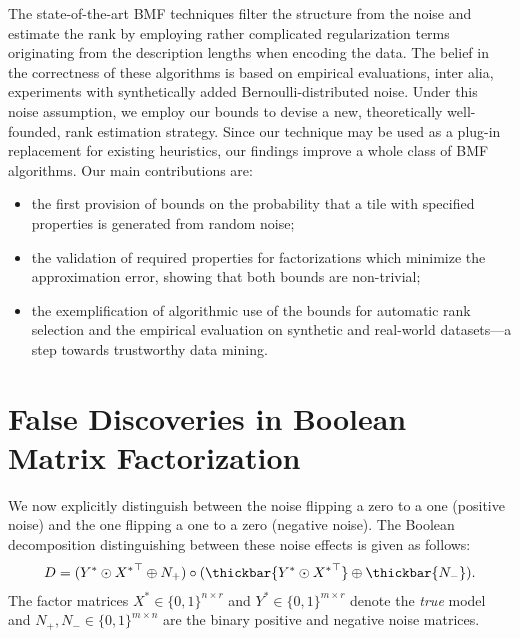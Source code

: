 The state-of-the-art BMF techniques filter the structure from the noise and estimate the rank by employing rather complicated regularization terms originating from the description lengths when encoding the data. The belief in the correctness of these algorithms is based on empirical evaluations, inter alia, experiments with synthetically added Bernoulli-distributed noise. 
Under this noise assumption, we employ our bounds to devise a new, theoretically well-founded, rank estimation strategy. Since our technique may be used as a plug-in replacement for existing heuristics, our findings improve a whole class of BMF algorithms.
Our main contributions are:
\begin{itemize}
\item the first provision of bounds on the probability that a tile with specified properties is generated from random noise;
\item the validation of required properties for factorizations which minimize the approximation error, showing that both bounds are non-trivial;
\item the exemplification of algorithmic use of the bounds for automatic rank selection and the empirical evaluation on synthetic and real-world datasets---a step towards trustworthy data mining. 
\end{itemize}
\section{False Discoveries in Boolean Matrix Factorization}\label{sec:TP:boundingFDR}
We now explicitly distinguish between the noise flipping a zero to a one (positive noise) and the one flipping a one to a zero (negative noise). The Boolean decomposition distinguishing between these noise effects is given as follows:
\begin{align}\label{eq:BMF0}
D=(Y^*\odot {X^*}^\top \oplus N_+) \circ (\thickbar{Y^*\odot {X^*}^\top} \oplus \thickbar{N_-}).
\end{align}
The factor matrices $X^*\in\{0,1\}^{n\times r}$ and $Y^*\in\{0,1\}^{m\times r}$ denote the \emph{true} model and $N_+,N_-\in\{0,1\}^{m\times n}$ are the binary positive and negative noise matrices. 

